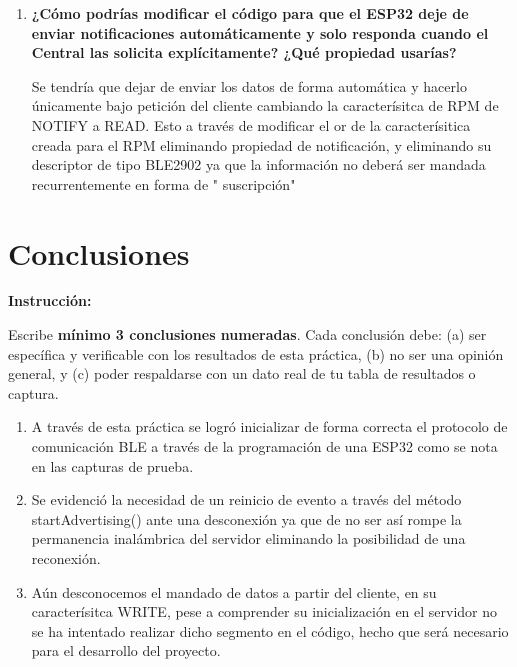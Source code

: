 \documentclass[12pt, letterpaper]{article}
\newenvironment{instruccion}{%
  \begin{mdframed}[
    backgroundcolor = tealLight,
    linecolor       = tealMain,
    linewidth       = 1pt,
    innerleftmargin = 10pt, innerrightmargin = 10pt,
    innertopmargin  = 6pt,  innerbottommargin= 6pt
  ]
  \small\color{tealMain}\textbf{Instrucción:}\hspace{4pt}\color{black}
}{%
  \end{mdframed}
}
\begin{document}
\begin{enumerate}[leftmargin=1.5cm, label=\textbf{P\arabic*.}]
  \item \textbf{¿Cómo podrías modificar el código para que el ESP32 deje de
        enviar notificaciones automáticamente y solo responda cuando el Central
        las solicita explícitamente? ¿Qué propiedad usarías?}

Se tendría que dejar de enviar los datos de forma automática y hacerlo únicamente bajo petición del cliente cambiando la caracterísitca de RPM de NOTIFY a READ. Esto a través de modificar el or de la caracterísitica creada para el RPM eliminando propiedad de notificación, y eliminando su descriptor de tipo BLE2902 ya que la información no deberá ser mandada recurrentemente en forma de " suscripción"
\\

\end{enumerate}


\section{Conclusiones}

\begin{instruccion}
  Escribe \textbf{mínimo 3 conclusiones numeradas}. Cada conclusión debe:
  (a) ser específica y verificable con los resultados de esta práctica,
  (b) no ser una opinión general, y
  (c) poder respaldarse con un dato real de tu tabla de resultados o captura.
\end{instruccion}

\begin{enumerate}[leftmargin=1.5cm]
  \item A través de esta práctica se logró inicializar de forma correcta el protocolo de comunicación BLE a través de la programación de una ESP32 como se nota en las capturas de prueba.
  \item Se evidenció la necesidad de un reinicio de evento a través del método startAdvertising() ante una desconexión ya que de no ser así rompe la permanencia inalámbrica del servidor eliminando la posibilidad de una reconexión.
  \item Aún desconocemos el mandado de datos a partir del cliente, en su caracterísitca WRITE, pese a comprender su inicialización en el servidor no se ha intentado realizar dicho segmento en el código, hecho que será necesario para el desarrollo del proyecto.
\end{enumerate}
\end{document}

